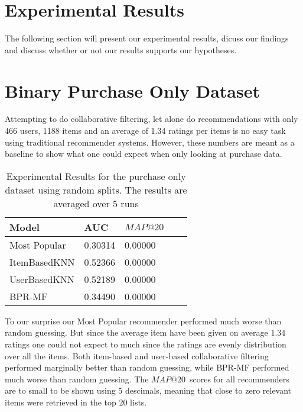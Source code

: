 
\section{Experimental Results}

The following section will present our experimental results, dicuss our findings and
discuss whether or not our results supports our hypotheses.

\section{Binary Purchase Only Dataset}

Attempting to do collaborative filtering, let alone do recommendations with only 466 users, 1188 items and
an average of 1.34 ratings per items is no easy task using traditional recommender systems. However, these numbers
are meant as a baseline to show what one could expect when only looking at purchase data.

\begin{table}[H]
    \centering
    \begin{tabular}{*{5}l}
    \toprule
    Model 			&	AUC			&	$MAP@20$ \\ \midrule
    \rowcolor{Gray}
    Most Popular	&	0.30314		&	0.00000	\\
    ItemBasedKNN	&	0.52366		&	0.00000	\\
    UserBasedKNN	&	0.52189		&	0.00000	\\
    BPR-MF			&	0.34490		&	0.00000	\\
    \bottomrule
    \end{tabular}
\caption[Experimental Results - Purchase Only Dataset]{Experimental Results for the purchase only dataset using random splits. The results are averaged over 5 runs}
\end{table}

To our surprise our Most Popular recommender performed much worse than random guessing. But since the average item
have been given on average 1.34 ratings one could not expect to much since the ratings are evenly distribution over
all the items. Both item-based and user-based collaborative filtering performed marginally better than random guessing,
while BPR-MF performed much worse than random guessing. The $MAP@20$ scores for all recommenders are to small to be shown
using 5 descimals, meaning that close to zero relevant items were retrieved in the top 20 lists.

